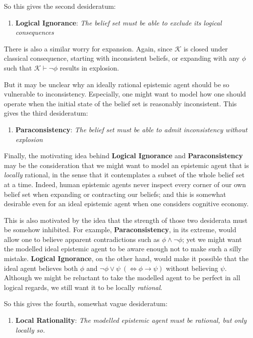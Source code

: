 \documentclass[12pt]{article}
\newcommand{\K}{\mathcal{K}}
\begin{document}
So this gives the second desideratum:
\begin{enumerate}
    \item[(D2)] \textbf{Logical Ignorance}: \textit{The belief set must be able to exclude its logical consequences}
\end{enumerate}
There is also a similar worry for expansion. Again, since $\K$ is closed under classical consequence, starting with inconsistent beliefs, or expanding with any $\phi$ such that $\K \vdash \lnot \phi$ results in explosion. 
\par
But it may be unclear why an ideally rational epistemic agent should be so vulnerable to inconsistency. Especially, one might want to model how one should operate when the initial state of the belief set is reasonably inconsistent. This gives the third desideratum:
\begin{enumerate}
    \item[(D3)] \textbf{Paraconsistency}: \textit{The belief set must be able to admit inconsistency without explosion}
\end{enumerate}
Finally, the motivating idea behind \textbf{Logical Ignorance} and \textbf{Paraconsistency} may be the consideration that we might want to model an epistemic agent that is \textit{locally} rational, in the sense that it contemplates a subset of the whole belief set at a time. Indeed, human epistemic agents never inspect every corner of our own belief set when expanding or contracting our beliefs; and this is somewhat desirable even for an ideal epistemic agent when one considers cognitive economy. 
\par
This is also motivated by the idea that the strength of those two desiderata must be somehow inhibited. For example, \textbf{Paraconsistency}, in its extreme, would allow one to believe apparent contradictions such as $\phi \land \lnot \phi$; yet we might want the modelled ideal epistemic agent to be aware enough not to make such a silly mistake. \textbf{Logical Ignorance}, on the other hand, would make it possible that the ideal agent believes both $\phi$ and $\lnot \phi \lor \psi \ (\iff \phi \rightarrow \psi)$ without believing $\psi$. Although we might be reluctant to take the modelled agent to be perfect in all logical regards, we still want it to be locally \textit{rational}. 
\par
So this gives the fourth, somewhat vague desideratum:
\begin{enumerate}
    \item[(D4)] \textbf{Local Rationality}: \textit{The modelled epistemic agent must be rational, but only locally so.}
\end{enumerate}
\end{document}
